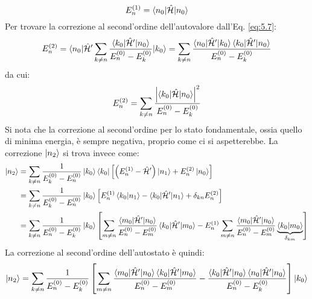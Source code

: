 \begin{equation}
	E_n^{(1)} = \braket{n_0 | \hat{\mathcal{H}} | n_0}
	\label{eq:5.11}
\end{equation}
Per trovare la correzione al second'ordine dell'autovalore dall'Eq. \ref{eq:5.7}:
\begin{equation*}
	E_n^{(2)} = \braket{n_0 | \hat{\mathcal{H}}' \sum_{k \neq n} \frac{\braket{k_0 | \hat{\mathcal{H}}' | n_0}}{E_n^{(0)} - E_k^{(0)}} | k_0} = \sum_{k \neq n} \frac{\braket{n_0 | \hat{\mathcal{H}}' | k_0} \braket{k_0 | \hat{\mathcal{H}}' | n_0}}{E_n^{(0)} - E_k^{(0)}}
\end{equation*}
da cui:
\begin{equation}
	E_n^{(2)} = \sum_{k \neq n} \frac{\left\lvert\braket{k_0 | \hat{\mathcal{H}} | n_0}\right\rvert^2}{E_n^{(0)} - E_k^{(0)}}
	\label{eq:5.12}
\end{equation}
Si nota che la correzione al second'ordine per lo stato fondamentale, ossia quello di minima energia, è sempre negativa, proprio come ci si aspetterebbe.
La correzione $ \ket{n_2} $ si trova invece come:
\begin{equation*}
	\begin{split}
		\ket{n_2}
		&= \sum_{k \neq n} \frac{1}{E_k^{(0)} - E_n^{(0)}} \ket{k_0} \bra{k_0} \left[ \left( E_n^{(1)} - \hat{\mathcal{H}}' \right) \ket{n_1} + E_n^{(2)} \ket{n_0} \right] \\
		&= \sum_{k \neq n} \frac{1}{E_k^{(0)} - E_n^{(0)}} \ket{k_0} \left[ E_n^{(1)} \braket{k_0 | n_1} - \braket{k_0 | \hat{\mathcal{H}}' | n_1} + \delta_{kn} E_n^{(2)} \right] \\
		&= \sum_{k \neq n} \frac{1}{E_n^{(0)} - E_k^{(0)}} \ket{k_0} \left[ \sum_{m \neq n} \frac{\braket{m_0 | \hat{\mathcal{H}}' | n_0}}{E_n^{(0)} - E_m^{(0)}} \braket{k_0 | \hat{\mathcal{H}}' | m_0} - E_n^{(1)} \sum_{m \neq n} \frac{\braket{m_0 | \hat{\mathcal{H}}' | n_0}}{E_n^{(0)} - E_m^{(0)}} \underbrace{\braket{k_0 | m_0}}_{\delta_{km}} \right]
	\end{split}
\end{equation*}
La correzione al second'ordine dell'autostato è quindi:
\begin{equation}
	\ket{n_2} = \sum_{k \neq n} \frac{1}{E_n^{(0)} - E_k^{(0)}} \left[ \sum_{m \neq n} \frac{\braket{m_0 | \hat{\mathcal{H}}' | n_0} \braket{k_0 | \hat{\mathcal{H}}' | m_0}}{E_n^{(0)} - E_m^{(0)}} - \frac{\braket{k_0 | \hat{\mathcal{H}}' | n_0} \braket{n_0 | \hat{\mathcal{H}}' | n_0}}{E_n^{(0)} - E_k^{(0)}} \right] \ket{k_0}
	\label{eq:5.13}
\end{equation}

